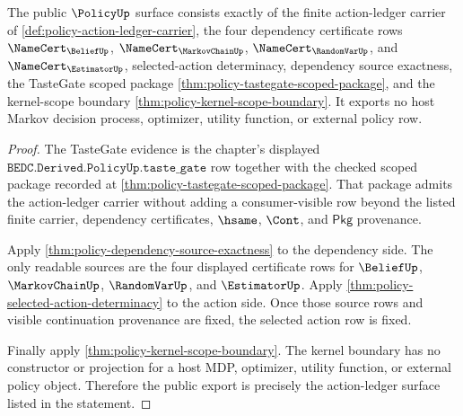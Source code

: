 \begin{theorem}
\label{thm:policy-public-export-surface}
The public $\PolicyUp$ surface consists exactly of the finite action-ledger
carrier of \autoref{def:policy-action-ledger-carrier}, the four dependency
certificate rows $\NameCert_{\BeliefUp}$, $\NameCert_{\MarkovChainUp}$,
$\NameCert_{\RandomVarUp}$, and $\NameCert_{\EstimatorUp}$, selected-action
determinacy, dependency source exactness, the TasteGate scoped package
\autoref{thm:policy-tastegate-scoped-package}, and the kernel-scope boundary
\autoref{thm:policy-kernel-scope-boundary}. It exports no host Markov decision
process, optimizer, utility function, or external policy row.
\end{theorem}
\begin{proof}
The TasteGate evidence is the chapter's displayed
$\texttt{BEDC.Derived.PolicyUp.taste\_gate}$ row together with the checked
scoped package recorded at \autoref{thm:policy-tastegate-scoped-package}. That
package admits the action-ledger carrier without adding a consumer-visible row
beyond the listed finite carrier, dependency certificates, $\hsame$, $\Cont$,
and $\mathsf{Pkg}$ provenance.

Apply \autoref{thm:policy-dependency-source-exactness} to the dependency side.
The only readable sources are the four displayed certificate rows for
$\BeliefUp$, $\MarkovChainUp$, $\RandomVarUp$, and $\EstimatorUp$. Apply
\autoref{thm:policy-selected-action-determinacy} to the action side. Once those
source rows and visible continuation provenance are fixed, the selected action
row is fixed.

Finally apply \autoref{thm:policy-kernel-scope-boundary}. The kernel boundary
has no constructor or projection for a host MDP, optimizer, utility function,
or external policy object. Therefore the public export is precisely the
action-ledger surface listed in the statement.
\end{proof}

